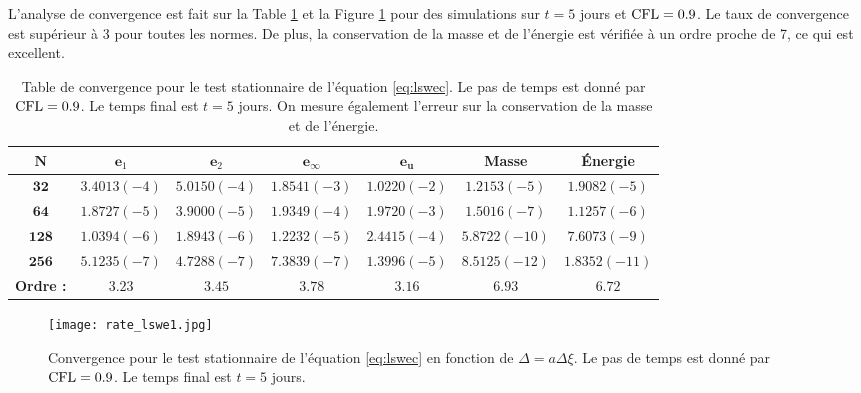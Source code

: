 L'analyse de convergence est fait sur la Table \ref{tab:rate_lswe1} et la Figure \ref{fig:rate_lswe1} pour des simulations sur $t=5$ jours et $\text{CFL}=0.9$. Le taux de convergence est supérieur à 3 pour toutes les normes. De plus, la conservation de la masse et de l'énergie est vérifiée à un ordre proche de 7, ce qui est excellent.

\begin{table}[htbp]
\begin{center}
\begin{tabular}{|c||c|c|c|c||c|c|}
\hline 
$\mathbf{N}$ & $\mathbf{e}_1$ & $\mathbf{e}_2$ & $\mathbf{e}_{\infty}$ & $\mathbf{e}_{\mathbf{u}}$ & \textbf{Masse} & \textbf{Énergie} \\ 
\hline 
\hline 
$\mathbf{32}$ & $3.4013(-4)$ & $5.0150(-4)$ & $1.8541(-3)$ & $1.0220(-2)$ & $1.2153(-5)$ & $1.9082(-5)$ \\ 

$\mathbf{64}$ & $1.8727(-5)$ & $3.9000(-5)$ & $1.9349(-4)$ & $1.9720(-3)$ & $1.5016(-7)$ & $1.1257(-6)$ \\ 

$\mathbf{128}$& $1.0394(-6)$ & $1.8943(-6)$ & $1.2232(-5)$ & $2.4415(-4)$ & $5.8722(-10)$ & $7.6073(-9)$ \\ 

$\mathbf{256}$& $5.1235(-7)$ & $4.7288(-7)$ & $7.3839(-7)$ & $1.3996(-5)$ & $8.5125(-12)$ & $1.8352(-11)$ \\ 

\hline
\textbf{Ordre :} & $3.23$ & $3.45$ & $3.78$ & $3.16$ & $6.93$ & $6.72$ \\ 
\hline
\end{tabular} 
\end{center}
\caption{Table de convergence pour le test stationnaire de l'équation \eqref{eq:lswec}. Le pas de temps est donné par $\text{CFL}=0.9$. Le temps final est $t=5$ jours. On mesure également l'erreur sur la conservation de la masse et de l'énergie.}
\label{tab:rate_lswe1}
\end{table}

\begin{figure}[htbp]
\begin{center}
\texttt{[image: rate\_lswe1.jpg]}
\end{center}
\caption{Convergence pour le test stationnaire de l'équation \eqref{eq:lswec} en fonction de $\Delta = a \Delta \xi$. Le pas de temps est donné par $\text{CFL}=0.9$. Le temps final est $t=5$ jours.}
\label{fig:rate_lswe1}
\end{figure}











